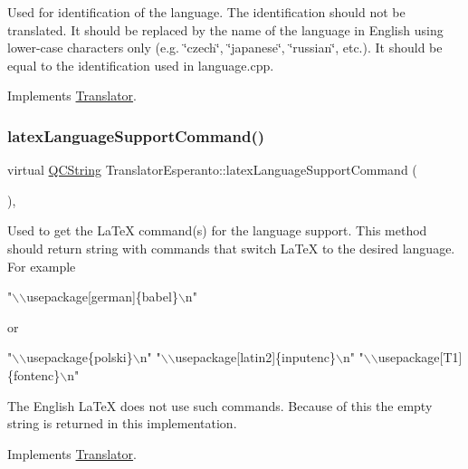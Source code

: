 Used for identification of the language. The identification should not be translated. It should be replaced by the name of the language in English using lower-\/case characters only (e.\+g. \char`\"{}czech\char`\"{}, \char`\"{}japanese\char`\"{}, \char`\"{}russian\char`\"{}, etc.). It should be equal to the identification used in language.\+cpp. 

Implements \mbox{\hyperlink{class_translator}{Translator}}.

\mbox{\label{class_translator_esperanto_aefc408ed06698996a0ec7d0cb8c2100e}} 
\subsubsection{\texorpdfstring{latexLanguageSupportCommand()}{latexLanguageSupportCommand()}}
{\footnotesize\ttfamily virtual \mbox{\hyperlink{class_q_c_string}{Q\+C\+String}} Translator\+Esperanto\+::latex\+Language\+Support\+Command (\begin{DoxyParamCaption}{ }\end{DoxyParamCaption})\hspace{0.3cm}{\ttfamily [inline]}, {\ttfamily [virtual]}}

Used to get the La\+TeX command(s) for the language support. This method should return string with commands that switch La\+TeX to the desired language. For example 
\begin{DoxyPre}"\(\backslash\)\(\backslash\)usepackage[german]\{babel\}\(\backslash\)n"
 \end{DoxyPre}
 or 
\begin{DoxyPre}"\(\backslash\)\(\backslash\)usepackage\{polski\}\(\backslash\)n"
 "\(\backslash\)\(\backslash\)usepackage[latin2]\{inputenc\}\(\backslash\)n"
 "\(\backslash\)\(\backslash\)usepackage[T1]\{fontenc\}\(\backslash\)n"
 \end{DoxyPre}


The English La\+TeX does not use such commands. Because of this the empty string is returned in this implementation. 

Implements \mbox{\hyperlink{class_translator}{Translator}}.

\mbox{\label{class_translator_esperanto_aef57799418ceda7d5e030c1f0f4e0a2a}} 
